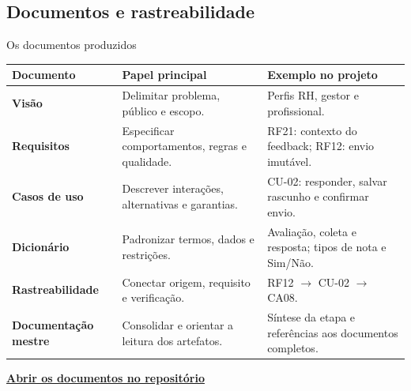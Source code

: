 \documentclass[aspectratio=169,t,xcolor=table]{beamer}
\renewcommand{\arraystretch}{1.16}
\newcommand{\head}[1]{\textcolor{UFGBlue}{\textbf{#1}}}
\begin{document}
\subsection{Documentos e rastreabilidade}
\begin{frame}{Os documentos produzidos}
\fontsize{9}{10.5}\selectfont\renewcommand{\arraystretch}{1.0}
\begin{tabularx}{\textwidth}{@{}L{.19\textwidth}YL{.40\textwidth}@{}}
\toprule\head{Documento} & \head{Papel principal} & \head{Exemplo no projeto}\\\midrule
\textbf{Visão} & Delimitar problema, público e escopo. & Perfis RH, gestor e profissional.\\[0cm]
\textbf{Requisitos} & Especificar comportamentos, regras e qualidade. & RF21: contexto do feedback; RF12: envio imutável.\\[0cm]
\textbf{Casos de uso} & Descrever interações, alternativas e garantias. & CU-02: responder, salvar rascunho e confirmar envio.\\[0cm]
\textbf{Dicionário} & Padronizar termos, dados e restrições. & Avaliação, coleta e resposta; tipos de nota e Sim/Não.\\[0cm]
\textbf{Rastreabilidade} & Conectar origem, requisito e verificação. & RF12 $\rightarrow$ CU-02 $\rightarrow$ CA08.\\[0cm]
\textbf{Documentação mestre} & Consolidar e orientar a leitura dos artefatos. & Síntese da etapa e referências aos documentos completos.\\\bottomrule
\end{tabularx}
\vspace{.2cm}\href{https://github.com/EnzoMachad0/projeto-dominios/tree/main/docs}{\textbf{Abrir os documentos no repositório}}
\end{frame}
\end{document}
